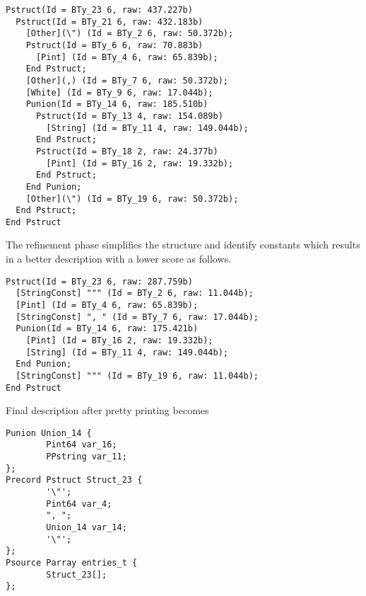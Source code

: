 \documentclass[preprint]{sig-alternate-sigmod08}
\begin{document}
{\small
\begin{verbatim}
Pstruct(Id = BTy_23 6, raw: 437.227b)
  Pstruct(Id = BTy_21 6, raw: 432.183b)
    [Other](\") (Id = BTy_2 6, raw: 50.372b);
    Pstruct(Id = BTy_6 6, raw: 70.883b)
      [Pint] (Id = BTy_4 6, raw: 65.839b);
    End Pstruct;
    [Other](,) (Id = BTy_7 6, raw: 50.372b);
    [White] (Id = BTy_9 6, raw: 17.044b);
    Punion(Id = BTy_14 6, raw: 185.510b)
      Pstruct(Id = BTy_13 4, raw: 154.089b)
        [String] (Id = BTy_11 4, raw: 149.044b);
      End Pstruct;
      Pstruct(Id = BTy_18 2, raw: 24.377b)
        [Pint] (Id = BTy_16 2, raw: 19.332b);
      End Pstruct;
    End Punion;
    [Other](\") (Id = BTy_19 6, raw: 50.372b);
  End Pstruct;
End Pstruct
\end{verbatim}
}

The refinement phase simplifies the structure
and identify constants which results in a better
description with a lower score as follows.

{\small
\begin{verbatim}
Pstruct(Id = BTy_23 6, raw: 287.759b)
  [StringConst] """ (Id = BTy_2 6, raw: 11.044b);
  [Pint] (Id = BTy_4 6, raw: 65.839b);
  [StringConst] ", " (Id = BTy_7 6, raw: 17.044b);
  Punion(Id = BTy_14 6, raw: 175.421b)
    [Pint] (Id = BTy_16 2, raw: 19.332b);
    [String] (Id = BTy_11 4, raw: 149.044b);
  End Punion;
  [StringConst] """ (Id = BTy_19 6, raw: 11.044b);
End Pstruct
\end{verbatim}
}

Final \pads{} description after pretty printing
becomes
{\small
\begin{verbatim}
Punion Union_14 {
        Pint64 var_16;
        PPstring var_11;
};
Precord Pstruct Struct_23 {
        '\"';
        Pint64 var_4;
        ", ";
        Union_14 var_14;
        '\"';
};
Psource Parray entries_t {
        Struct_23[];
};
\end{verbatim}
}

%
%
%



\end{document}
